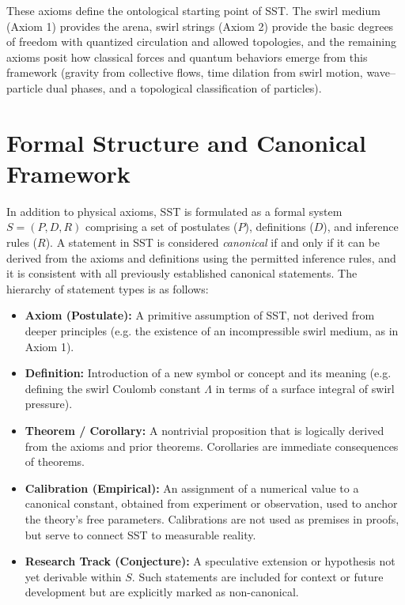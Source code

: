 \documentclass[reprint,aps,onecolumn,nofootinbib]{revtex4-2}
\begin{document}
	These axioms define the ontological starting point of SST. The swirl medium (Axiom 1) provides the arena, swirl strings (Axiom 2) provide the basic degrees of freedom with quantized circulation and allowed topologies, and the remaining axioms posit how classical forces and quantum behaviors emerge from this framework (gravity from collective flows, time dilation from swirl motion, wave–particle dual phases, and a topological classification of particles).


	\section{Formal Structure and Canonical Framework}
	In addition to physical axioms, SST is formulated as a formal system $S = (P, D, R)$ comprising a set of postulates ($P$), definitions ($D$), and inference rules ($R$). A statement in SST is considered \emph{canonical} if and only if it can be derived from the axioms and definitions using the permitted inference rules, and it is consistent with all previously established canonical statements. The hierarchy of statement types is as follows:

	\begin{itemize}
	    \item \textbf{Axiom (Postulate):} A primitive assumption of SST, not derived from deeper principles (e.g. the existence of an incompressible swirl medium, as in Axiom 1).
	    \item \textbf{Definition:} Introduction of a new symbol or concept and its meaning (e.g. defining the swirl Coulomb constant $\Lambda$ in terms of a surface integral of swirl pressure).
	    \item \textbf{Theorem / Corollary:} A nontrivial proposition that is logically derived from the axioms and prior theorems. Corollaries are immediate consequences of theorems.
	    \item \textbf{Calibration (Empirical):} An assignment of a numerical value to a canonical constant, obtained from experiment or observation, used to anchor the theory’s free parameters. Calibrations are not used as premises in proofs, but serve to connect SST to measurable reality.
	    \item \textbf{Research Track (Conjecture):} A speculative extension or hypothesis not yet derivable within $S$. Such statements are included for context or future development but are explicitly marked as non-canonical.
	\end{itemize}
\end{document}
